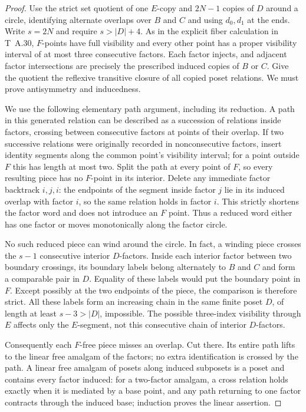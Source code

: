 \begin{proof}
Use the strict set quotient of one $E$-copy and $2N-1$ copies of $D$
around a circle, identifying alternate overlaps over $B$ and $C$ and
using $d_0,d_1$ at the ends. Write $s=2N$ and require $s>|D|+4$.
As in the explicit fiber calculation in T~A.30, $F$-points have full
visibility and every other point has a proper visibility interval of
at most three consecutive factors. Each factor injects, and adjacent
factor intersections are precisely the prescribed induced copies of
$B$ or $C$. Give the quotient the reflexive transitive closure of all
copied poset relations. We must prove antisymmetry and inducedness.

We use the following elementary path argument, including its reduction.
A path in this generated relation can be described as a succession of
relations inside factors, crossing between consecutive factors at points
of their overlap. If two successive relations were originally recorded
in nonconsecutive factors, insert identity segments along the common
point's visibility interval; for a point outside $F$ this has length at
most two. Split the path at every point of $F$, so every resulting piece
has no $F$-point in its interior. Delete any immediate factor backtrack
$i,j,i$: the endpoints of the segment inside factor $j$ lie in its
induced overlap with factor $i$, so the same relation holds in factor $i$.
This strictly shortens the factor word and does not introduce an $F$
point. Thus a reduced word either has one factor or moves monotonically
along the factor circle.

No such reduced piece can wind around the circle. In fact, a winding
piece crosses the $s-1$ consecutive interior $D$-factors. Inside each
interior factor between two boundary crossings, its boundary labels
belong alternately to $B$ and $C$ and form a comparable pair in $D$.
Equality of these labels would put the boundary point in $F$.
Except possibly at the two endpoints of the piece, the comparison is
therefore strict. All these labels form an increasing chain in the
same finite poset $D$, of length at least $s-3>|D|$, impossible.
The possible three-index visibility through $E$ affects only the
$E$-segment, not this consecutive chain of interior $D$-factors.

Consequently each $F$-free piece misses an overlap. Cut there. Its
entire path lifts to the linear free amalgam of the factors; no extra
identification is crossed by the path. A linear free amalgam of posets
along induced subposets is a poset and contains every factor induced:
for a two-factor amalgam, a cross relation holds exactly when it is
mediated by a base point, and any path returning to one factor contracts
through the induced base; induction proves the linear assertion.


\end{proof}
